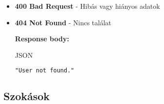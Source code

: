 \documentclass[12pt]{report}
\begin{document}
\begin{description}
\begin{itemize}
      \item \textbf{400 Bad Request} - Hibás vagy hiányos adatok
      \item \textbf{404 Not Found} - Nincs találat

        \textbf{Response body:}
        \begin{codeblock}{JSON}
          \begin{verbatim}
"User not found."
          \end{verbatim}
        \end{codeblock}
    \end{itemize}
\end{description}

\subsection{Szokások}
\end{document}
